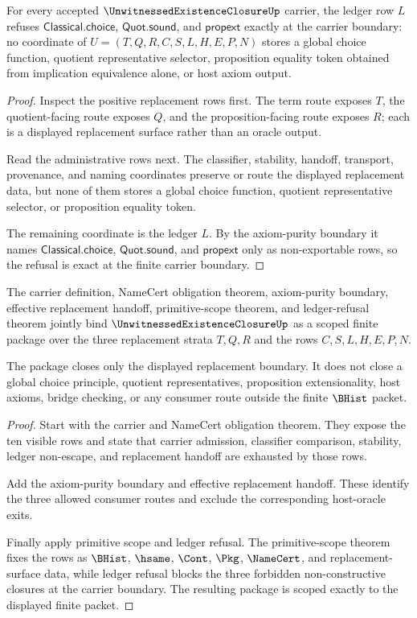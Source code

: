 \begin{theorem}
\label{thm:unwitnessed-existence-closure-ledger-refusal}
For every accepted $\UnwitnessedExistenceClosureUp$ carrier, the ledger row $L$ refuses $\mathsf{Classical.choice}$, $\mathsf{Quot.sound}$, and $\mathsf{propext}$ exactly at the carrier boundary: no coordinate of $U=(T,Q,R,C,S,L,H,E,P,N)$ stores a global choice function, quotient representative selector, proposition equality token obtained from implication equivalence alone, or host axiom output.
\end{theorem}
\begin{proof}
Inspect the positive replacement rows first. The term route exposes $T$, the quotient-facing route exposes $Q$, and the proposition-facing route exposes $R$; each is a displayed replacement surface rather than an oracle output.

Read the administrative rows next. The classifier, stability, handoff, transport, provenance, and naming coordinates preserve or route the displayed replacement data, but none of them stores a global choice function, quotient representative selector, or proposition equality token.

The remaining coordinate is the ledger $L$. By the axiom-purity boundary it names $\mathsf{Classical.choice}$, $\mathsf{Quot.sound}$, and $\mathsf{propext}$ only as non-exportable rows, so the refusal is exact at the finite carrier boundary.
\end{proof}

\begin{theorem}
\label{thm:unwitnessed-existence-closure-scoped-boundary-package}
The carrier definition, NameCert obligation theorem, axiom-purity boundary, effective replacement handoff, primitive-scope theorem, and ledger-refusal theorem jointly bind $\UnwitnessedExistenceClosureUp$ as a scoped finite package over the three replacement strata $T,Q,R$ and the rows $C,S,L,H,E,P,N$.

The package closes only the displayed replacement boundary. It does not close a global choice principle, quotient representatives, proposition extensionality, host axioms, bridge checking, or any consumer route outside the finite $\BHist$ packet.
\end{theorem}
\begin{proof}
Start with the carrier and NameCert obligation theorem. They expose the ten visible rows and state that carrier admission, classifier comparison, stability, ledger non-escape, and replacement handoff are exhausted by those rows.

Add the axiom-purity boundary and effective replacement handoff. These identify the three allowed consumer routes and exclude the corresponding host-oracle exits.

Finally apply primitive scope and ledger refusal. The primitive-scope theorem fixes the rows as $\BHist$, $\hsame$, $\Cont$, $\Pkg$, $\NameCert$, and replacement-surface data, while ledger refusal blocks the three forbidden non-constructive closures at the carrier boundary. The resulting package is scoped exactly to the displayed finite packet.
\end{proof}

